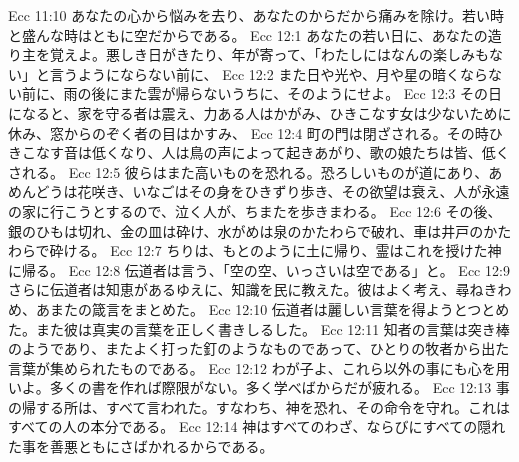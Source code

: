 Ecc 11:10  あなたの心から悩みを去り、あなたのからだから痛みを除け。若い時と盛んな時はともに空だからである。
Ecc 12:1  あなたの若い日に、あなたの造り主を覚えよ。悪しき日がきたり、年が寄って、「わたしにはなんの楽しみもない」と言うようにならない前に、
Ecc 12:2  また日や光や、月や星の暗くならない前に、雨の後にまた雲が帰らないうちに、そのようにせよ。
Ecc 12:3  その日になると、家を守る者は震え、力ある人はかがみ、ひきこなす女は少ないために休み、窓からのぞく者の目はかすみ、
Ecc 12:4  町の門は閉ざされる。その時ひきこなす音は低くなり、人は鳥の声によって起きあがり、歌の娘たちは皆、低くされる。
Ecc 12:5  彼らはまた高いものを恐れる。恐ろしいものが道にあり、あめんどうは花咲き、いなごはその身をひきずり歩き、その欲望は衰え、人が永遠の家に行こうとするので、泣く人が、ちまたを歩きまわる。
Ecc 12:6  その後、銀のひもは切れ、金の皿は砕け、水がめは泉のかたわらで破れ、車は井戸のかたわらで砕ける。
Ecc 12:7  ちりは、もとのように土に帰り、霊はこれを授けた神に帰る。
Ecc 12:8  伝道者は言う、「空の空、いっさいは空である」と。
Ecc 12:9  さらに伝道者は知恵があるゆえに、知識を民に教えた。彼はよく考え、尋ねきわめ、あまたの箴言をまとめた。
Ecc 12:10  伝道者は麗しい言葉を得ようとつとめた。また彼は真実の言葉を正しく書きしるした。
Ecc 12:11  知者の言葉は突き棒のようであり、またよく打った釘のようなものであって、ひとりの牧者から出た言葉が集められたものである。
Ecc 12:12  わが子よ、これら以外の事にも心を用いよ。多くの書を作れば際限がない。多く学べばからだが疲れる。
Ecc 12:13  事の帰する所は、すべて言われた。すなわち、神を恐れ、その命令を守れ。これはすべての人の本分である。
Ecc 12:14  神はすべてのわざ、ならびにすべての隠れた事を善悪ともにさばかれるからである。


